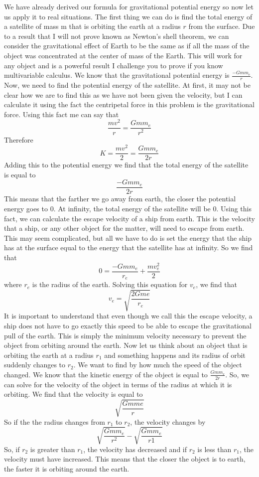 \documentclass{article}[gray]
\numberwithin{equation}{subsection}
\begin{document}
We have already derived our formula for gravitational potential energy so now let us apply it to real situations. The first thing we can do is find the total energy of a satellite of mass m that is orbiting the earth at a radius $r$ from the surface. Due to a result that I will not prove known as Newton’s shell theorem, we can consider the gravitational effect of Earth to be the same as if all the mass of the object was concentrated at the center of mass of the Earth. This will work for any object and is a powerful result I challenge you to prove if you know multivariable calculus. 
We know that the gravitational potential energy is $\frac{-Gm m_e}{r}$. Now, we need to find the potential energy of the satellite. At first, it may not be clear how we are to find this as we have not been given the velocity, but I can calculate it using the fact the centripetal force in this problem is the gravitational force. Using this fact me can say that \begin{equation}\frac{mv^2}{r}=\frac{Gmm_e}{r^2}\end{equation} Therefore \begin{equation}K=\frac{mv^2}{2} = \frac{G m m_e}{2r}\end{equation} Adding this to the potential energy we find that the total energy of the satellite is equal to $$\frac{-G m m_e}{2r}$$ This means that the farther we go away from earth, the closer the potential energy goes to 0. At infinity, the total energy of the satellite will be 0. 
Using this fact, we can calculate the escape velocity of a ship from earth. This is the velocity that a ship, or any other object for the matter, will need to escape from earth. This may seem complicated, but all we have to do is set the energy that the ship has at the surface equal to the energy that the satellite has at infinity. So we find that \begin{equation}0=\frac{-G m m_e}{r_e}+\frac{mv_{e}^2}{2}\end{equation} where $r_e$ is the radius of the earth. Solving this equation for $v_e$, we find that $$v_e=\sqrt{\frac{2Gme}{r_e}}$$ It is important to understand that even though we call this the escape velocity, a ship does not have to go exactly this speed to be able to escape the gravitational pull of the earth. This is simply the minimum velocity necessary to prevent the object from orbiting around the earth. 
Now let us think about an object that is orbiting the earth at a radius $r_1$ and something happens and its radius of orbit suddenly changes to $r_2$. We want to find by how much the speed of the object changed. We know that the kinetic energy of the object is equal to $\frac{G m m_e}{2r}$. So, we can solve for the velocity of the object in terms of the radius at which it is orbiting. We find that the velocity is equal to $$\sqrt{\frac{Gmme}{r}}$$ So if the the radius changes from $r_1$ to $r_2$, the velocity changes by $$\sqrt{\frac{G m m_e}{r^2}}-\sqrt{\frac{G m m_e}{r1}}$$ So, if $r_2$ is greater than $r_1$, the velocity has decreased and if $r_2$ is less than $r_1$, the velocity must have increased. This means that the closer the object is to earth, the faster it is orbiting around the earth.
\end{document}
